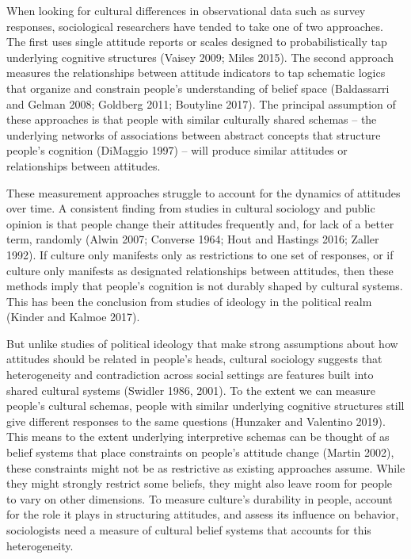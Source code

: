 \documentclass[12pt,]{article}
\begin{document}
When looking for cultural differences in observational data such as survey responses, sociological researchers have tended to take one of two approaches. The first uses single attitude reports or scales designed to probabilistically tap underlying cognitive structures (Vaisey 2009; Miles 2015). The second approach measures the relationships between attitude indicators to tap schematic logics that organize and constrain people's understanding of belief space (Baldassarri and Gelman 2008; Goldberg 2011; Boutyline 2017). The principal assumption of these approaches is that people with similar culturally shared schemas -- the underlying networks of associations between abstract concepts that structure people's cognition (DiMaggio 1997) -- will produce similar attitudes or relationships between attitudes.

These measurement approaches struggle to account for the dynamics of attitudes over time. A consistent finding from studies in cultural sociology and public opinion is that people change their attitudes frequently and, for lack of a better term, randomly (Alwin 2007; Converse 1964; Hout and Hastings 2016; Zaller 1992). If culture only manifests only as restrictions to one set of responses, or if culture only manifests as designated relationships between attitudes, then these methods imply that people's cognition is not durably shaped by cultural systems. This has been the conclusion from studies of ideology in the political realm (Kinder and Kalmoe 2017).

But unlike studies of political ideology that make strong assumptions about how attitudes should be related in people's heads, cultural sociology suggests that heterogeneity and contradiction across social settings are features built into shared cultural systems (Swidler 1986, 2001). To the extent we can measure people's cultural schemas, people with similar underlying cognitive structures still give different responses to the same questions (Hunzaker and Valentino 2019). This means to the extent underlying interpretive schemas can be thought of as belief systems that place constraints on people's attitude change (Martin 2002), these constraints might not be as restrictive as existing approaches assume. While they might strongly restrict some beliefs, they might also leave room for people to vary on other dimensions. To measure culture's durability in people, account for the role it plays in structuring attitudes, and assess its influence on behavior, sociologists need a measure of cultural belief systems that accounts for this heterogeneity.
\end{document}
